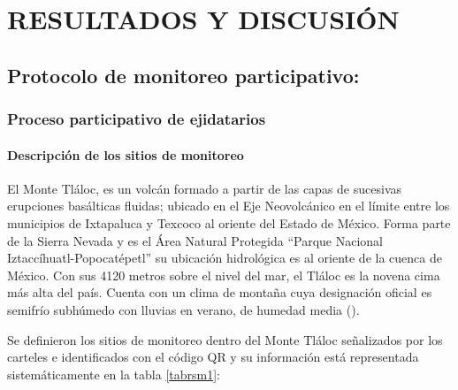 \chapter{RESULTADOS Y DISCUSIÓN}


\section{Protocolo de monitoreo participativo:}
\subsection{Proceso participativo de ejidatarios}
\subsubsection{Descripción de los sitios de monitoreo}
El Monte Tláloc, es un volcán formado a partir de las capas de sucesivas erupciones basálticas fluidas; ubicado en el Eje Neovolcánico en el límite entre los municipios de Ixtapaluca y Texcoco al oriente del Estado de México. Forma parte de la Sierra Nevada y es el Área Natural Protegida “Parque Nacional Iztaccíhuatl-Popocatépetl” su ubicación hidrológica es al oriente de la cuenca de México. Con sus 4120 metros sobre el nivel del mar, el Tláloc es la novena cima más alta del país. Cuenta con un clima de montaña cuya designación oficial es semifrío subhúmedo con lluvias en verano, de humedad media (\cite{inegi_texcoco}).

Se definieron los sitios de monitoreo dentro del Monte Tláloc señalizados por los carteles e identificados con el código QR y su información está representada sistemáticamente en la tabla \ref{tabrsm1}: 

